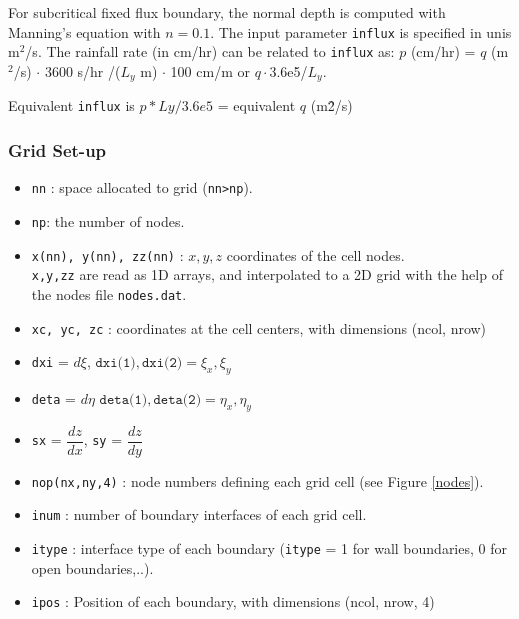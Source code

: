 \documentclass{article}
\newcommand{\code}[1]{\texttt{#1}}
\begin{document}
  For subcritical fixed flux boundary,  the normal depth is computed  with Manning's equation with $n=0.1$.  
The input parameter \code{influx} is specified in unis m$^2$/s.  The rainfall rate (in cm/hr) can be related to \code{influx} as:
$p$ (cm/hr) = $q$ (m$^2$/s) $\cdot$ 3600 s/hr /($L_y$ m) $\cdot$ 100 cm/m
 or $q \cdot$3.6e5/$L_y$.
 
 Equivalent \code{influx} is $p*Ly/3.6e5$ = equivalent $q$ (m\^2/s)


\subsubsection*{Grid Set-up}

\begin{itemize}
	\item \code{nn} : space allocated to grid (\code{nn>np}).
	\item  \code{np}:  the number of nodes. 
	\item \code{x(nn), y(nn), zz(nn)} : $x,y,z$ coordinates of the cell nodes.  \\[0.1cm]
		\code{x,y,zz} are read as 1D arrays, and interpolated to a 2D grid with the help of the nodes file \code{nodes.dat}.
		\item  \code{xc, yc, zc} : coordinates at the cell centers, with dimensions (ncol, nrow)
		
	\item  \code{dxi} = $d\xi$, \quad  $\code{dxi(1)},\code{dxi(2)} =   \xi_x, \xi_y $
	\item  \code{deta} =  $d\eta$ \quad  $\code{deta(1)},\code{deta(2)} =   \eta_x, \eta_y $

	\item \code{sx} = $\dfrac{dz}{dx}$,  \code{sy} =  $\dfrac{dz}{dy}$
	\item \code{nop(nx,ny,4)} : node numbers defining each grid cell (see Figure \ref{nodes}).  

	\item \code{inum} : number of boundary interfaces of each grid cell.
	\item \code{itype} :  interface type of each boundary (\code{itype} = 1 for wall boundaries, 0 for open boundaries,..).  
	\item \code{ipos} :  Position of each boundary, with dimensions (ncol, nrow, 4)
\end{itemize}
\end{document}
